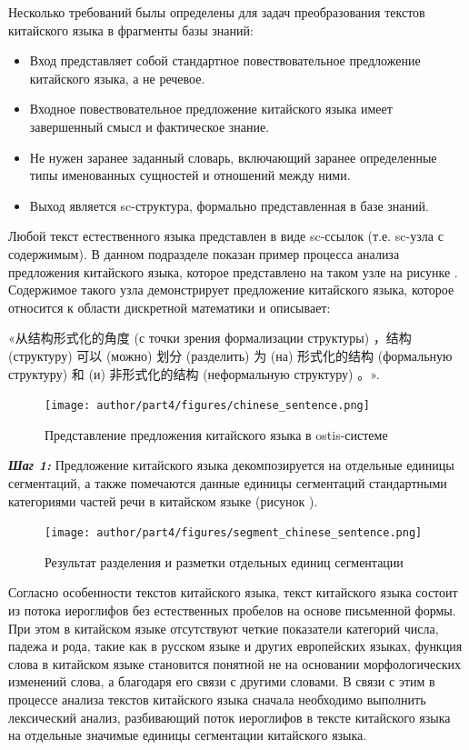 Несколько требований былы определены для задач преобразования текстов китайского языка в фрагменты базы знаний:
\begin{itemize}
	\item Вход представляет собой стандартное повествовательное предложение китайского языка, а не речевое.
	\item Входное повествовательное предложение китайского языка имеет завершенный смысл и фактическое знание.
	\item Не нужен заранее заданный словарь, включающий заранее определенные типы именованных сущностей и отношений между ними.
	\item Выход является sc-структура, формально представленная в базе знаний.
\end{itemize}

Любой текст естественного языка представлен в виде sc-ссылок (т.е. sc-узла с содержимым). В данном подразделе показан пример процесса анализа предложения китайского языка, которое представлено на таком узле на рисунке \textit{}. Содержимое такого узла демонстрирует предложение китайского языка, которое относится к области дискретной математики и описывает: \begin{CJK}{UTF8}{gbsn}«从结构形式化的角度 (с точки зрения формализации структуры) ，结构(структуру) 可以 (можно) 划分 (разделить) 为 (на) 形式化的结构 (формальную структуру) 和 (и) 非形式化的结构 (неформальную структуру) 。». \end{CJK}
\begin{figure}[H]
	\centering
	\texttt{[image: author/part4/figures/chinese\_sentence.png]}
	\caption{Представление предложения китайского языка в ostis-системе}
	\label{fig:chinese-sentence-sc}
\end{figure}

\textbf{\textit{Шаг 1:}} Предложение китайского языка декомпозируется на отдельные единицы сегментаций, а также помечаются данные единицы сегментаций стандартными категориями частей речи в китайском языке (рисунок \textit{}).
\begin{figure}[H]
	\centering
	\texttt{[image: author/part4/figures/segment\_chinese\_sentence.png]}
	\caption{Результат разделения и разметки отдельных единиц сегментации}
	\label{fig:segment-chinese}
\end{figure}

Согласно особенности текстов китайского языка, текст китайского языка состоит из потока иероглифов без естественных пробелов на основе письменной формы. При этом в китайском языке отсутствуют четкие показатели категорий числа, падежа и рода, такие как в русском языке и других европейских языках, функция слова в китайском языке становится понятной не на основании морфологических изменений слова, а благодаря его связи с другими словами. В связи с этим в процессе анализа текстов китайского языка сначала необходимо выполнить лексический анализ, разбивающий поток иероглифов в тексте китайского языка на отдельные значимые единицы сегментации китайского языка. 

